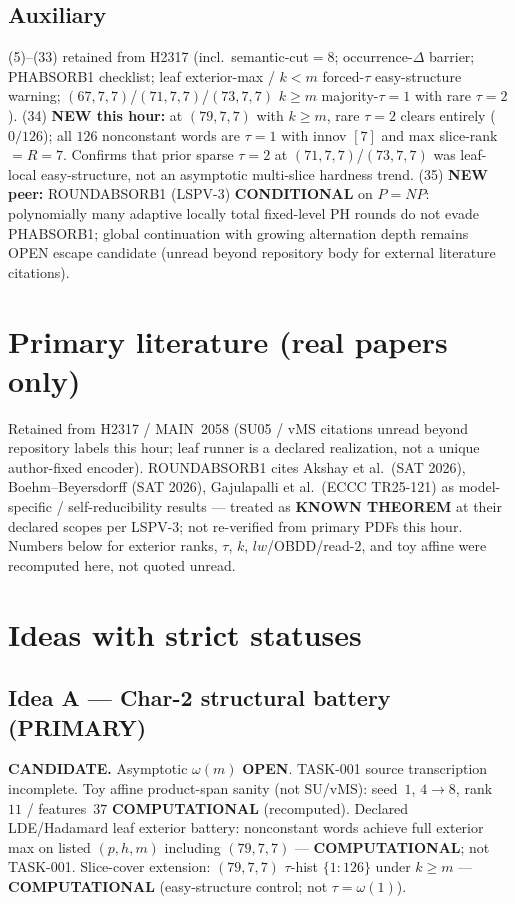 \documentclass[11pt]{article}
\begin{document}
\subsection*{Auxiliary}
(5)--(33) retained from H2317 (incl.\ semantic-cut$=8$; occurrence-$\Delta$ barrier;
PHABSORB1 checklist; leaf exterior-max / $k{<}m$ forced-$\tau$ easy-structure warning;
$(67,7,7)$/$(71,7,7)$/$(73,7,7)$ $k{\ge}m$ majority-$\tau{=}1$ with rare $\tau{=}2$).
(34) \textbf{NEW this hour:} at $(79,7,7)$ with $k{\ge}m$, rare $\tau{=}2$ clears entirely
($0/126$); all $126$ nonconstant words are $\tau{=}1$ with innov $[7]$ and max slice-rank $=R{=}7$.
Confirms that prior sparse $\tau{=}2$ at $(71,7,7)$/$(73,7,7)$ was leaf-local easy-structure,
not an asymptotic multi-slice hardness trend.
(35) \textbf{NEW peer:} ROUNDABSORB1 (LSPV-3) \textbf{CONDITIONAL} on $P{=}NP$: polynomially many
adaptive locally total fixed-level PH rounds do not evade PHABSORB1; global continuation with
growing alternation depth remains OPEN escape candidate (unread beyond repository body for
external literature citations).

\section*{Primary literature (real papers only)}
Retained from H2317 / MAIN~2058 (SU05 / vMS citations unread beyond repository labels this hour;
leaf runner is a declared realization, not a unique author-fixed encoder).
ROUNDABSORB1 cites Akshay et al.\ (SAT 2026), Boehm--Beyersdorff (SAT 2026), Gajulapalli et al.\
(ECCC TR25-121) as model-specific / self-reducibility results --- treated as
\textbf{KNOWN THEOREM} at their declared scopes per LSPV-3; not re-verified from primary PDFs this hour.
Numbers below for exterior ranks, $\tau$, $k$, $lw$/OBDD/read-$2$, and toy affine
were recomputed here, not quoted unread.

\section*{Ideas with strict statuses}
\subsection*{Idea A --- Char-2 structural battery (PRIMARY)}
\textbf{CANDIDATE.} Asymptotic $\omega(m)$ \textbf{OPEN}. TASK-001 source transcription incomplete.
Toy affine product-span sanity (not SU/vMS): seed~$1$, $4\to8$, rank~$11$ / features~$37$
\textbf{COMPUTATIONAL} (recomputed).
Declared LDE/Hadamard leaf exterior battery: nonconstant words achieve full exterior max on
listed $(p,h,m)$ including $(79,7,7)$ --- \textbf{COMPUTATIONAL}; not TASK-001.
Slice-cover extension: $(79,7,7)$ $\tau$-hist $\{1{:}126\}$ under $k{\ge}m$ ---
\textbf{COMPUTATIONAL} (easy-structure control; not $\tau=\omega(1)$).
\end{document}

